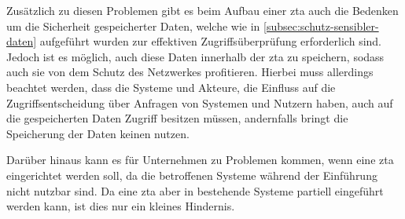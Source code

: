 Zusätzlich zu diesen Problemen gibt es beim Aufbau einer \ac{zta} auch die Bedenken um die Sicherheit gespeicherter Daten, welche wie in \autoref{subsec:schutz-sensibler-daten} aufgeführt wurden zur effektiven Zugriffsüberprüfung erforderlich sind.
Jedoch ist es möglich, auch diese Daten innerhalb der \ac{zta} zu speichern, sodass auch sie von dem Schutz des Netzwerkes profitieren.
Hierbei muss allerdings beachtet werden, dass die Systeme und Akteure, die Einfluss auf die Zugriffsentscheidung über Anfragen von Systemen und Nutzern haben, auch auf die gespeicherten Daten Zugriff besitzen müssen, andernfalls bringt die Speicherung der Daten keinen nutzen.

Darüber hinaus kann es für Unternehmen zu Problemen kommen, wenn eine \ac{zta} eingerichtet werden soll, da die betroffenen Systeme während der Einführung nicht nutzbar sind.
Da eine \ac{zta} aber in bestehende Systeme partiell eingeführt werden kann, ist dies nur ein kleines Hindernis.


